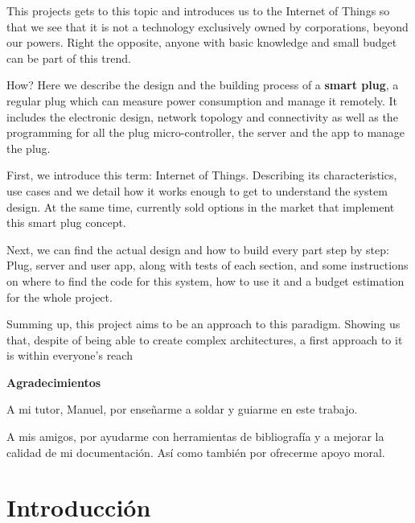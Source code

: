 \documentclass[a4paper,10pt]{article}
\begin{document}
\begin{titlepage}
This projects gets to this topic and introduces us to the Internet of
Things so that we see that it is not a technology exclusively owned by
corporations, beyond our powers. Right the opposite, anyone with basic
knowledge and small budget can be part of this trend.

How? Here we describe the design and the building process of a
\textbf{smart plug}, a regular plug which can measure power
consumption and manage it remotely. It includes the electronic design,
network topology and connectivity as well as the programming for all
the plug micro-controller, the server and the app to manage the plug.

First, we introduce this term: Internet of Things. Describing its
characteristics, use cases and we detail how it works enough to get to
understand the system design. At the same time, currently sold
options in the market that implement this smart plug concept.

Next, we can find the actual design and how to build every part step
by step: Plug, server and user app, along with tests of each section,
and some instructions on where to find the code for this system, how
to use it and a budget estimation for the whole project.

Summing up, this project aims to be an approach to this
paradigm. Showing us that, despite of being able to create complex
architectures, a first approach to it is within everyone's reach

\thispagestyle{empty}

\newpage


\LARGE  \textbf{Agradecimientos}

\vspace{2cm}

\large
A mi tutor, Manuel, por enseñarme a soldar y guiarme en este trabajo.

\vspace{1cm}
A mis amigos, por ayudarme con herramientas de bibliografía y a
mejorar la calidad de mi documentación. Así como también por ofrecerme
apoyo moral.

\thispagestyle{empty}

\end{titlepage}

\newpage

\tableofcontents

\fontsize{12}{16}\selectfont

\newpage

\section{Introducción}\label{intro}
\end{document}
